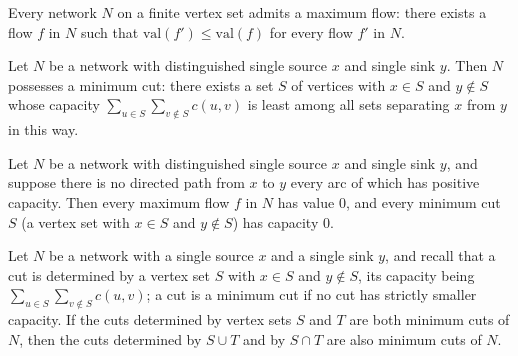 \begin{theorem}
\label{Networks.exists_maxFlow}
\leanok
{}
Every network $N$ on a finite vertex set admits a maximum flow: there exists a flow $f$
in $N$ such that $\mathrm{val}(f') \le \mathrm{val}(f)$ for every flow $f'$ in $N$.
\end{theorem}

\begin{theorem}
\label{Networks.exists_minCut}
\leanok
{}
Let $N$ be a network with distinguished single source $x$ and single sink $y$. Then $N$
possesses a minimum cut: there exists a set $S$ of vertices with $x \in S$ and $y \notin
S$ whose capacity $\sum_{u \in S}\sum_{v \notin S} c(u,v)$ is least among all sets
separating $x$ from $y$ in this way.
\end{theorem}

\begin{theorem}
\label{Networks.maxFlow_and_minCut_zero_of_no_path}
\leanok
{}
Let $N$ be a network with distinguished single source $x$ and single sink $y$, and
suppose there is no directed path from $x$ to $y$ every arc of which has positive
capacity. Then every maximum flow $f$ in $N$ has value $0$, and every minimum cut $S$ (a
vertex set with $x \in S$ and $y \notin S$) has capacity $0$.
\end{theorem}

\begin{theorem}
\label{Networks.isMinCut_union_inter}
\leanok
{}
Let $N$ be a network with a single source $x$ and a single sink $y$, and recall that a
cut is determined by a vertex set $S$ with $x \in S$ and $y \notin S$, its capacity
being $\sum_{u \in S}\sum_{v \notin S} c(u,v)$; a cut is a minimum cut if no cut has
strictly smaller capacity. If the cuts determined by vertex sets $S$ and $T$ are both
minimum cuts of $N$, then the cuts determined by $S \cup T$ and by $S \cap T$ are also
minimum cuts of $N$.
\end{theorem}

